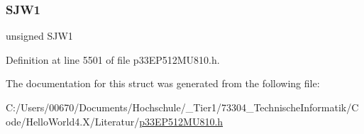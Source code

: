 \subsubsection{\texorpdfstring{S\+J\+W1}{SJW1}}
{\footnotesize\ttfamily unsigned S\+J\+W1}



Definition at line 5501 of file p33\+E\+P512\+M\+U810.\+h.



The documentation for this struct was generated from the following file\+:\begin{DoxyCompactItemize}
\item 
C\+:/\+Users/00670/\+Documents/\+Hochschule/\+\_\+\+Tier1/73304\+\_\+\+Technische\+Informatik/\+Code/\+Hello\+World4.\+X/\+Literatur/\hyperlink{p33_e_p512_m_u810_8h}{p33\+E\+P512\+M\+U810.\+h}\end{DoxyCompactItemize}
